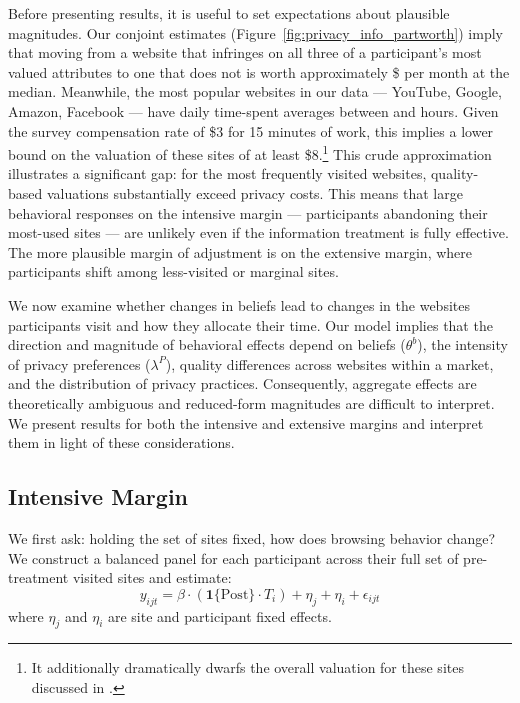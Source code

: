\documentclass[12pt]{article}
\theoremstyle{definition}
\theoremstyle{remark}
\begin{document}
Before presenting results, it is useful to set expectations about plausible magnitudes. Our conjoint estimates (Figure~\ref{fig:privacy_info_partworth}) imply that moving from a website that infringes on all three of a participant's most valued attributes to one that does not is worth approximately \$\wtpTopThreeMedian{} per month at the median. Meanwhile, the most popular websites in our data --- YouTube, Google, Amazon, Facebook --- have daily time-spent averages between \topWebFourActiveHours{} and \topWebOneActiveHours{} hours. Given the survey compensation rate of \$3 for 15 minutes of work, this implies a lower bound on the valuation of these sites of at least \$8.\footnote{It additionally dramatically dwarfs the overall valuation for these sites discussed in \cite{brynjolfsson2019using}.} %
 This crude approximation illustrates a significant gap: for the most frequently visited websites, quality-based valuations substantially exceed privacy costs. This means that large behavioral responses on the intensive margin --- participants abandoning their most-used sites --- are unlikely even if the information treatment is fully effective. The more plausible margin of adjustment is on the extensive margin, where participants shift among less-visited or marginal sites.
 
We now examine whether changes in beliefs lead to changes in the websites participants visit and how they allocate their time. Our model implies that the direction and magnitude of behavioral effects depend on beliefs ($\theta^b$), the intensity of privacy preferences ($\lambda^P$), quality differences across websites within a market, and the distribution of privacy practices. Consequently, aggregate effects are theoretically ambiguous and reduced-form magnitudes are difficult to interpret. We present results for both the intensive and extensive margins and interpret them in light of these considerations.

\subsection{Intensive Margin}
 
We first ask: holding the set of sites fixed, how does browsing behavior change? We construct a balanced panel for each participant across their full set of pre-treatment visited sites and estimate:
\begin{equation}
    y_{ijt} = \beta \cdot (\mathbf{1}\{\text{Post}\} \cdot T_i) + \eta_j + \eta_i + \epsilon_{ijt}
\end{equation}
where $\eta_j$ and $\eta_i$ are site and participant fixed effects.
 
\end{document}
